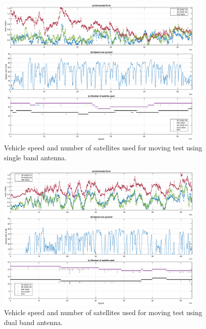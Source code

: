 \documentclass[letterpaper, 10 pt,onecolumn]{article}
\begin{document}
	\begin{figure}[H]
		\centering
		\includegraphics[width=0.9\textwidth]{figures/dynamicinfo_single.eps}
		\caption{Vehicle speed and number of satellites used for moving test using single band antenna.}
		\label{fig:m1vspeed}
	\end{figure}
	
	\begin{figure}[H]
		\centering
		\includegraphics[width=0.9\textwidth]{figures/dynamicinfo_dual.eps}
		\caption{Vehicle speed and number of satellites used for moving test using dual band antenna.}
		\label{fig:m2vspeed}
	\end{figure}
	
\end{document}
